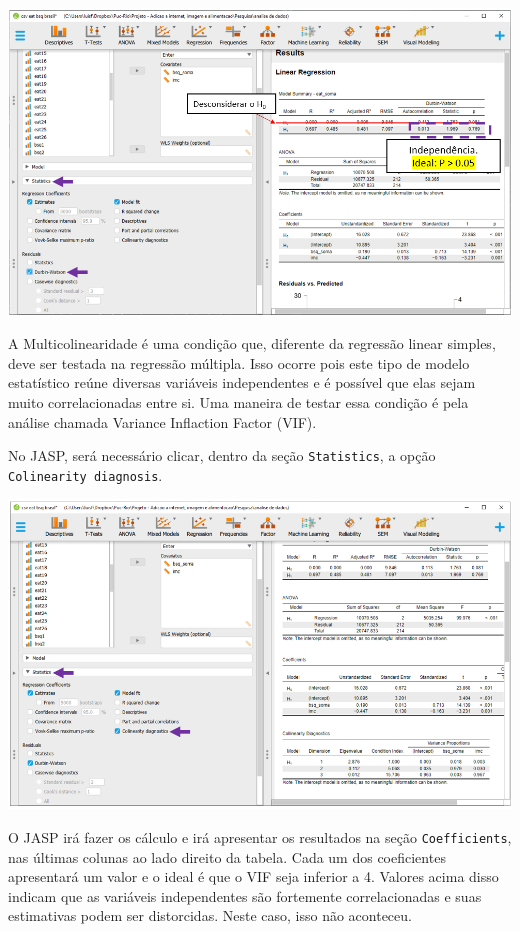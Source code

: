 \documentclass[
]{book}
\begin{document}
\includegraphics{./img/cap_reg_multipla_ind_residuos2.png}

A Multicolinearidade é uma condição que, diferente da regressão linear
simples, deve ser testada na regressão múltipla. Isso ocorre pois este
tipo de modelo estatístico reúne diversas variáveis independentes e é
possível que elas sejam muito correlacionadas entre si. Uma maneira de
testar essa condição é pela análise chamada Variance Inflaction Factor
(VIF).

No JASP, será necessário clicar, dentro da seção \texttt{Statistics}, a
opção \texttt{Colinearity\ diagnosis}.

\includegraphics{./img/cap_reg_multipla_colinearidade_jasp.png}

O JASP irá fazer os cálculo e irá apresentar os resultados na seção
\texttt{Coefficients}, nas últimas colunas ao lado direito da tabela.
Cada um dos coeficientes apresentará um valor e o ideal é que o VIF seja
inferior a 4. Valores acima disso indicam que as variáveis independentes
são fortemente correlacionadas e suas estimativas podem ser distorcidas.
Neste caso, isso não aconteceu.
\end{document}
